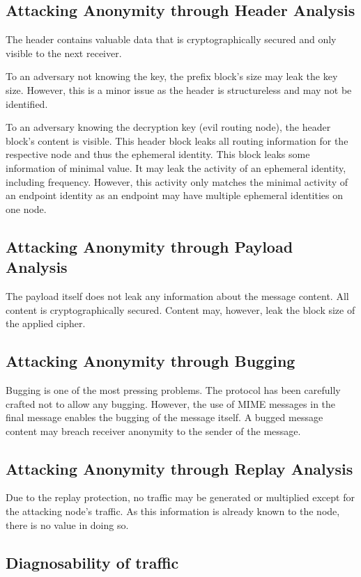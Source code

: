 \subsection{Attacking Anonymity through Header Analysis}
The header contains valuable data that is cryptographically secured and only visible to the next receiver. 

To an adversary not knowing the key, the prefix block's size may leak the key size. However, this is a minor issue as the header is structureless and may not be identified. 

To an adversary knowing the decryption key (evil routing node), the header block's content is visible. This header block leaks all routing information for the respective node and thus the ephemeral identity. This block leaks some information of minimal value. It may leak the activity of an ephemeral identity, including frequency. However, this activity only matches the minimal activity of an endpoint identity as an endpoint may have multiple ephemeral identities on one node. 

\subsection{Attacking Anonymity through Payload Analysis}
The payload itself does not leak any information about the message content. All content is cryptographically secured. Content may, however, leak the block size of the applied cipher.

\subsection{Attacking Anonymity through Bugging}
Bugging is one of the most pressing problems. The protocol has been carefully crafted not to allow any bugging. However, the use of MIME messages in the final message enables the bugging of the message itself. A bugged message content may breach receiver anonymity to the sender of the message.

\subsection{Attacking Anonymity through Replay Analysis}
Due to the replay protection, no traffic may be generated or multiplied except for the attacking node's traffic. As this information is already known to the node, there is no value in doing so. 

\subsection{Diagnosability of traffic}

